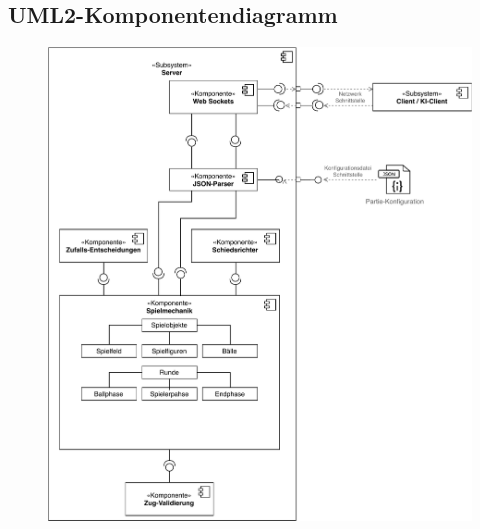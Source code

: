 \subsection{UML2-Komponentendiagramm}

\begin{figure}[H]
    \centering
    \includegraphics[scale=0.9]{images/Server-Architektur_DrawIO-Gesammt.pdf}
\end{figure}

\newpage